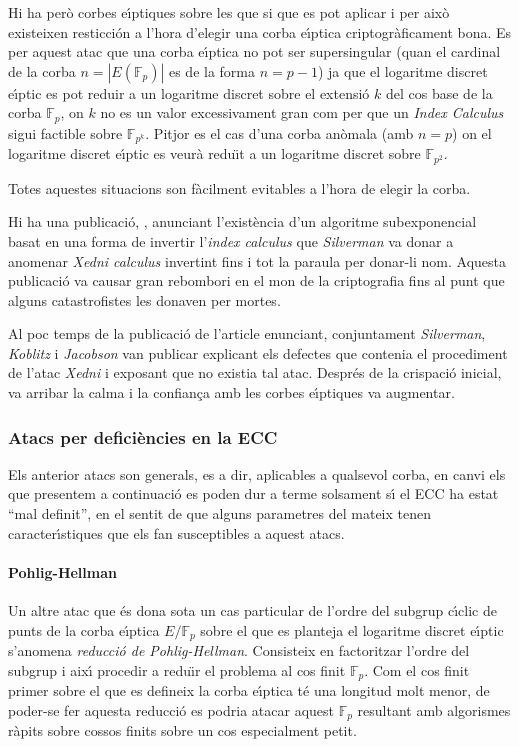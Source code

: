 \documentclass[12pt,twoside,catalan,a4paper]{book}%
\numberwithin{figure}{section}		%
\theoremstyle{definition}   			%
\def\ce{corba e\lgem{}\'{\i}ptica}%
\def\ces{corbes e\lgem{}\'{\i}ptiques}%
\def\cf{cos finit}%
\def\cfs{cossos finits}%
\def\sgc{subgrup c\'{\i}clic}%
\def\ecdlp{logaritme discret e\lgem{}\'{\i}ptic}%
\newcommand{\Fp}{\ensuremath{\mathbb{F}_p}}%
\newcommand{\EFp}{\ensuremath{E(\mathbb{F}_p)}}%
\newcommand{\EFpbis}{\ensuremath{E/\mathbb{F}_p}}
\theoremstyle{saltolinea}   			%
\begin{document}
Hi ha per\`o \ces{} sobre les que si que es pot aplicar i per aix\`o existeixen resticci\'on a l'hora d'elegir una \ce{} criptogr\`aficament bona. Es per aquest atac que una \ce{} no pot ser supersingular (quan el cardinal de la corba $n=\left|\EFp\right|$ es de la forma $n = p-1$) ja que el \ecdlp{} es pot reduir a un logaritme discret sobre el extensi\'o $k$ del cos base de la corba \Fp{}, on $k$ no es un valor excessivament gran com per que un \emph{Index Calculus} sigui factible sobre $\mathbb{F}_{p^k}$. Pitjor es el cas d'una corba an\`omala (amb $n=p$) on el \ecdlp{} es veur\`a redu\"{\i}t a un logaritme discret sobre $\mathbb{F}_{p^2}$.

Totes aquestes situacions son f\`acilment evitables a l'hora de elegir la corba.

Hi ha una publicaci\'o, \cite{Silv99}, anunciant l'exist\`encia d'un algoritme subexponencial basat en una forma de invertir l'\emph{index calculus} que \emph{Silverman} va donar a anomenar \emph{Xedni calculus} invertint fins i tot la paraula per donar-li nom. Aquesta publicaci\'o va causar gran rebombori en el mon de la criptografia fins al punt que alguns catastrofistes les donaven per mortes.

Al poc temps de la publicaci\'o de l'article enunciant, conjuntament \emph{Silverman}, \emph{Koblitz} i \emph{Jacobson} van publicar \cite{Xedni99} explicant els defectes que contenia el procediment de l'atac \emph{Xedni} i exposant que no existia tal atac. Despr\'es de la crispaci\'o inicial, va arribar la calma i la confian\c{c}a amb les \ces{} va augmentar.

\subsubsection{Atacs per defici\`encies en la ECC}
Els anterior atacs son generals, es a dir, aplicables a qualsevol corba, en canvi els que presentem a continuaci\'o es poden dur a terme solsament s\'{\i} el ECC ha estat ``mal definit'', en el sentit de que alguns parametres del mateix tenen caracter\'{\i}stiques que els fan susceptibles a aquest atacs.

\paragraph{Pohlig-Hellman}
Un altre atac que \'es dona sota un cas particular de l'ordre del \sgc{} de punts de la \ce{} \EFpbis{} sobre el que es planteja el \ecdlp{} s'anomena \emph{reducci\'o de Pohlig-Hellman}. Consisteix en factoritzar l'ordre del subgrup i aix\'{\i} procedir a redu\"{\i}r el problema al cos finit \Fp{}. Com el \cf{} primer sobre el que es defineix la \ce{} t\'e una longitud molt menor, de poder-se fer aquesta reducci\'o es podria atacar aquest \Fp{} resultant amb algorismes r\`apits sobre \cfs{} sobre un cos especialment petit.
\end{document}
